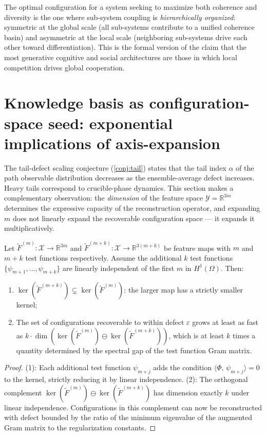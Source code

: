 \documentclass[12pt, oneside]{memoir}
\newcommand{\X}{\mathcal{X}}
\newcommand{\Ft}{\widetilde{F}}
\newcommand{\ip}[2]{\langle #1,\, #2 \rangle}
\begin{document}
The optimal configuration for a system seeking to maximize both coherence and diversity
is the one where sub-system coupling is \emph{hierarchically organized}: symmetric
at the global scale (all sub-systems contribute to a unified coherence basin) and
asymmetric at the local scale (neighboring sub-systems drive each other toward
differentiation).  This is the formal version of the claim that the most generative
cognitive and social architectures are those in which local competition drives global
cooperation.

\section{Knowledge basis as configuration-space seed: exponential implications of axis-expansion}
\label{sec:knowledge-basis}

The tail-defect scaling conjecture (\cref{conj:tail}) states that the tail index $\alpha$
of the path observable distribution decreases as the ensemble-average defect increases.
Heavy tails correspond to crucible-phase dynamics.  This section makes a complementary
observation: the \emph{dimension} of the feature space $\mathcal{Y} = \mathbb{R}^{3m}$
determines the expressive capacity of the reconstruction operator, and expanding $m$
does not linearly expand the recoverable configuration space — it expands it
multiplicatively.

\begin{proposition}
\label{prop:mult-expansion}
Let $\Ft^{(m)}: \X \to \mathbb{R}^{3m}$ and $\Ft^{(m+k)}: \X \to \mathbb{R}^{3(m+k)}$
be feature maps with $m$ and $m+k$ test functions respectively.  Assume the additional
$k$ test functions $\{\psi_{m+1}, \dots, \psi_{m+k}\}$ are linearly independent of
the first $m$ in $H^1(\Omega)$.  Then:
\begin{enumerate}
  \item $\ker(\Ft^{(m+k)}) \subsetneq \ker(\Ft^{(m)})$: the larger map has a strictly
        smaller kernel;
  \item The set of configurations recoverable to within defect $\varepsilon$ grows at
        least as fast as $k \cdot \dim(\ker(\Ft^{(m)}) \ominus \ker(\Ft^{(m+k)}))$,
        which is at least $k$ times a quantity determined by the spectral gap of the
        test function Gram matrix.
\end{enumerate}
\end{proposition}

\begin{proof}
(1): Each additional test function $\psi_{m+j}$ adds the condition $\ip{\Phi}{\psi_{m+j}}
= 0$ to the kernel, strictly reducing it by linear independence.  (2): The orthogonal
complement $\ker(\Ft^{(m)}) \ominus \ker(\Ft^{(m+k)})$ has dimension exactly $k$ under
linear independence.  Configurations in this complement can now be reconstructed with
defect bounded by the ratio of the minimum eigenvalue of the augmented Gram matrix to
the regularization constants.
\end{proof}
\end{document}
